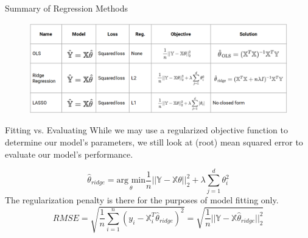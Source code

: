 \documentclass[aspectratio=169]{../latex_main/tntbeamer}  %
\begin{document}
	
	\begin{frame}{Summary of Regression Methods}
	   
	   \begin{figure}
	       \centering
	       \includegraphics[scale=.4]{Bild19}
	   \end{figure}
	\end{frame}
	
	
	\begin{frame}{Fitting vs. Evaluating}
	While we may use a regularized objective function to determine our model’s parameters, we still look at (root) mean squared error to evaluate our model’s performance.
    
    \begin{equation*}
        \hat{\theta}_{ridge} = \underset{\theta}{\text{arg min}}\frac{1}{n}||\mathbb{Y} - \mathbb{X}\theta||_2^2 + \lambda \sum\limits_{j=1}^d\theta_i^2 
    \end{equation*}
    The regularization penalty is there for the purposes of model fitting only.
    \begin{equation*}
        RMSE = \sqrt{\frac{1}{n}\sum\limits_{i=1}^n(y_i - \mathbb{X}_i^T\hat{\theta}_{ridge})^2} = \sqrt{\frac{1}{n}||\mathbb{Y} - \mathbb{X}\hat{\theta}_{ridge}||_2^2}
    \end{equation*}
	\end{frame}
	
\end{document}
